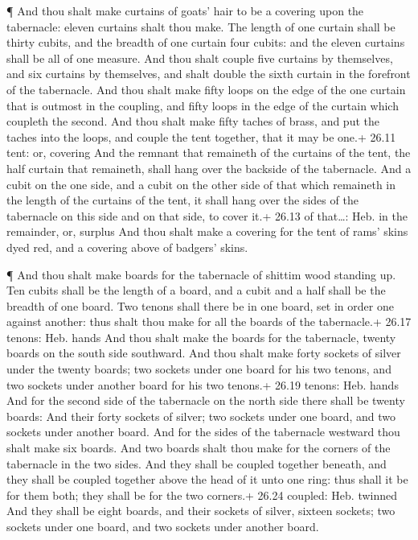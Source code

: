  ¶ And thou shalt make curtains of goats' hair to be a
covering upon the tabernacle: eleven curtains shalt thou make.
 The length of one curtain shall be thirty cubits, and the
breadth of one curtain four cubits: and the eleven curtains shall be all
of one measure.  And thou shalt couple five curtains by
themselves, and six curtains by themselves, and shalt double the sixth
curtain in the forefront of the tabernacle.  And thou shalt
make fifty loops on the edge of the one curtain that is outmost in the
coupling, and fifty loops in the edge of the curtain which coupleth the
second.  And thou shalt make fifty taches of brass, and put
the taches into the loops, and couple the tent together, that it may be
one.+ 26.11 tent: or, covering  And the remnant that
remaineth of the curtains of the tent, the half curtain that remaineth,
shall hang over the backside of the tabernacle.  And a
cubit on the one side, and a cubit on the other side of that which
remaineth in the length of the curtains of the tent, it shall hang over
the sides of the tabernacle on this side and on that side, to cover it.+
26.13 of that\ldots: Heb. in the remainder, or, surplus 
And thou shalt make a covering for the tent of rams' skins dyed red, and
a covering above of badgers' skins.

 ¶ And thou shalt make boards for the tabernacle of shittim
wood standing up.  Ten cubits shall be the length of a
board, and a cubit and a half shall be the breadth of one board.
 Two tenons shall there be in one board, set in order one
against another: thus shalt thou make for all the boards of the
tabernacle.+ 26.17 tenons: Heb. hands  And thou shalt make
the boards for the tabernacle, twenty boards on the south side
southward.  And thou shalt make forty sockets of silver
under the twenty boards; two sockets under one board for his two tenons,
and two sockets under another board for his two tenons.+ 26.19 tenons:
Heb. hands  And for the second side of the tabernacle on
the north side there shall be twenty boards:  And their
forty sockets of silver; two sockets under one board, and two sockets
under another board.  And for the sides of the tabernacle
westward thou shalt make six boards.  And two boards shalt
thou make for the corners of the tabernacle in the two sides.
 And they shall be coupled together beneath, and they shall
be coupled together above the head of it unto one ring: thus shall it be
for them both; they shall be for the two corners.+ 26.24 coupled: Heb.
twinned  And they shall be eight boards, and their sockets
of silver, sixteen sockets; two sockets under one board, and two sockets
under another board.

